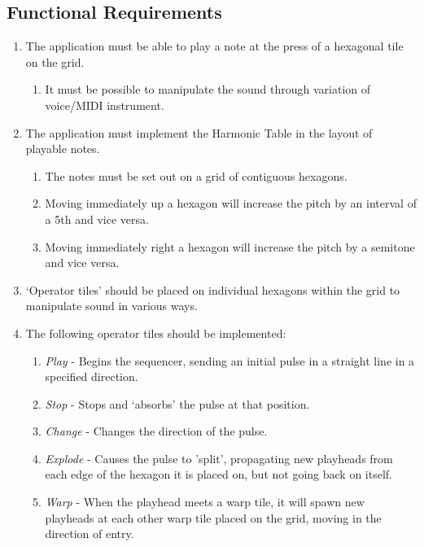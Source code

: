 \documentclass[10pt,a4paper]{article}
\begin{document}
\subsection{Functional Requirements}
\begin{enumerate}

\item The application must be able to play a note at the press of a hexagonal tile on the grid.
\begin{enumerate}
\item It must be possible to manipulate the sound through variation of voice/MIDI instrument.
\end{enumerate}

\item The application must implement the Harmonic Table in the layout of playable notes.
\begin{enumerate}
\item The notes must be set out on a grid of contiguous hexagons.
\item Moving immediately up a hexagon will increase the pitch by an interval of a 5th and vice versa.
\item Moving immediately right a hexagon will increase the pitch by a semitone and vice versa.
\end{enumerate}

\item `Operator tiles' should be placed on individual hexagons within the grid to manipulate sound in various ways.

\item The following operator tiles should be implemented:
\begin{enumerate}
\item \textit{Play} - Begins the sequencer, sending an initial pulse in a straight line in a specified direction.
\item \textit{Stop} - Stops and `absorbs' the pulse at that position.
\item \textit{Change} - Changes the direction of the pulse.
\item \textit{Explode} - Causes the pulse to 'split', propagating new playheads from each edge of the hexagon it is placed on, but not going back on itself.
\item \textit{Warp} - When the playhead meets a warp tile, it will spawn new playheads at each other warp tile placed on the grid, moving in the direction of entry. 
\end{enumerate}


\end{enumerate}
\end{document}
